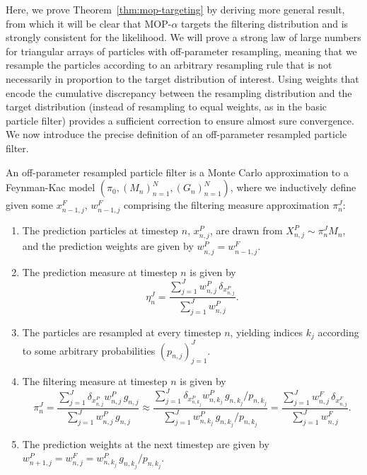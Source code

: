 

Here, we prove Theorem~\ref{thm:mop-targeting} by deriving more general result, from which it will be clear that MOP-$\alpha$ targets the filtering distribution and is strongly consistent for the likelihood.
We will prove a strong law of large numbers for triangular arrays of particles with off-parameter resampling, meaning that we resample the particles according to an arbitrary resampling rule that is not necessarily in proportion to the target distribution of interest. 
Using weights that encode the cumulative discrepancy between the resampling distribution and the target distribution (instead of resampling to equal weights, as in the basic particle filter) provides a sufficient correction to ensure almost sure convergence.
We now introduce the precise definition of an off-parameter resampled particle filter. 

\begin{defn}
    \label{defn:off-parameter-filter}
    An off-parameter resampled particle filter is a Monte Carlo approximation to a Feynman-Kac model $\left(\pi_0,\left(M_n\right)_{n=1}^N,\left(G_n\right)_{n=1}^N\right)$, where we inductively define given some $x_{n-1,j}^F$, $w_{n-1,j}^F$ comprising the filtering measure approximation $\pi_n^J$:
    \begin{enumerate}
        \item The prediction particles at timestep $n$, $x_{n,j}^P$, are drawn from $X_{n,j}^P \sim \pi_n^J M_n$, and the prediction weights are given by $w_{n,j}^P = w_{n-1,j}^F$. 
        \item The prediction measure at timestep $n$ is given by 
        \begin{equation}
        \eta_n^J = \frac{\sum_{j=1}^J w_{n,j}^P \, \delta_{x_{n,j}^P}}{\sum_{j=1}^J w_{n,j}^P}.
        \end{equation}
        \item The particles are resampled at every timestep $n$, yielding indices $k_j$ according to some arbitrary probabilities $(p_{n,j})_{j=1}^J$.
        \item The filtering measure at timestep $n$ is given by
        \begin{equation}
        \pi_n^J = \frac{\sum_{j=1}^J \delta_{x_{n,j}^P } w_{n,j}^P \, g_{n,j}}{\sum_{j=1}^J w_{n,j}^P \, g_{n,j}} \approx \frac{\sum_{j=1}^J \delta_{x_{n,k_j}^P }w_{n,k_j}^P \, g_{n,k_j}\big/p_{n,k_j}}{\sum_{j=1}^J w_{n,k_j}^P\, g_{n,k_j}\big/p_{n,k_j}} = \frac{\sum_{j=1}^J w_{n,j}^F \, \delta_{x_{n,j}^F}}{\sum_{j=1}^J w_{n,j}^F}.
        \end{equation}
        \item The prediction weights at the next timestep are given by $w_{n+1,j}^P = w_{n,j}^F =  w_{n,k_j}^P \, g_{n,k_j}\big/p_{n,k_j}$.
    \end{enumerate}
\end{defn}


